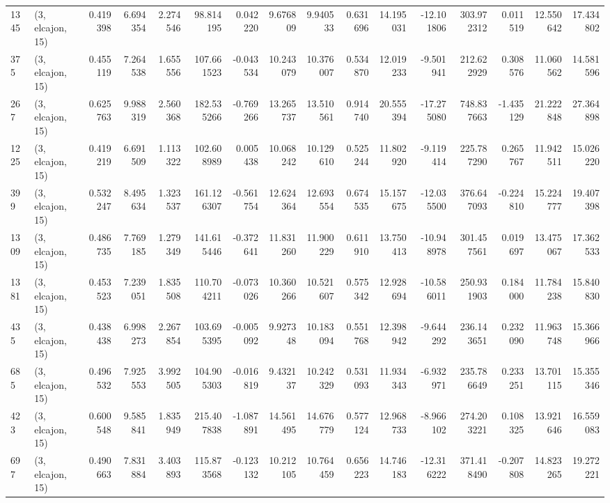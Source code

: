 \begin{tabular}{llrrrrrrrrrrrrrr}
1345 &  (3, elcajon, 15) &   0.419398 &   6.694354 &   2.274546 &     98.814195 &    0.042220 &    9.676809 &    9.940533 &  0.631696 &  14.195031 & -12.101806 &   303.972312 &   0.011519 &  12.550642 &  17.434802 \\
375  &  (3, elcajon, 15) &   0.455119 &   7.264538 &   1.655556 &    107.661523 &   -0.043534 &   10.243079 &   10.376007 &  0.534870 &  12.019233 &  -9.501941 &   212.622929 &   0.308576 &  11.060562 &  14.581596 \\
267  &  (3, elcajon, 15) &   0.625763 &   9.988319 &   2.560368 &    182.535266 &   -0.769266 &   13.265737 &   13.510561 &  0.914740 &  20.555394 & -17.275080 &   748.837663 &  -1.435129 &  21.222848 &  27.364898 \\
1225 &  (3, elcajon, 15) &   0.419219 &   6.691509 &   1.113322 &    102.608989 &    0.005438 &   10.068242 &   10.129610 &  0.525244 &  11.802920 &  -9.119414 &   225.787290 &   0.265767 &  11.942511 &  15.026220 \\
399  &  (3, elcajon, 15) &   0.532247 &   8.495634 &   1.323537 &    161.126307 &   -0.561754 &   12.624364 &   12.693554 &  0.674535 &  15.157675 & -12.035500 &   376.647093 &  -0.224810 &  15.224777 &  19.407398 \\
1309 &  (3, elcajon, 15) &   0.486735 &   7.769185 &   1.279349 &    141.615446 &   -0.372641 &   11.831260 &   11.900229 &  0.611910 &  13.750413 & -10.948978 &   301.457561 &   0.019697 &  13.475067 &  17.362533 \\
1381 &  (3, elcajon, 15) &   0.453523 &   7.239051 &   1.835508 &    110.704211 &   -0.073026 &   10.360266 &   10.521607 &  0.575342 &  12.928694 & -10.586011 &   250.931903 &   0.184000 &  11.784238 &  15.840830 \\
435  &  (3, elcajon, 15) &   0.438438 &   6.998273 &   2.267854 &    103.695395 &   -0.005092 &    9.927348 &   10.183094 &  0.551768 &  12.398942 &  -9.644292 &   236.143651 &   0.232090 &  11.963748 &  15.366966 \\
685  &  (3, elcajon, 15) &   0.496532 &   7.925553 &   3.992505 &    104.905303 &   -0.016819 &    9.432137 &   10.242329 &  0.531093 &  11.934343 &  -6.932971 &   235.786649 &   0.233251 &  13.701115 &  15.355346 \\
423  &  (3, elcajon, 15) &   0.600548 &   9.585841 &   1.835949 &    215.407838 &   -1.087891 &   14.561495 &   14.676779 &  0.577124 &  12.968733 &  -8.966102 &   274.203221 &   0.108325 &  13.921646 &  16.559083 \\
697  &  (3, elcajon, 15) &   0.490663 &   7.831884 &   3.403893 &    115.873568 &   -0.123132 &   10.212105 &   10.764459 &  0.656223 &  14.746183 & -12.316222 &   371.418490 &  -0.207808 &  14.823265 &  19.272221 \\

\end{tabular}
